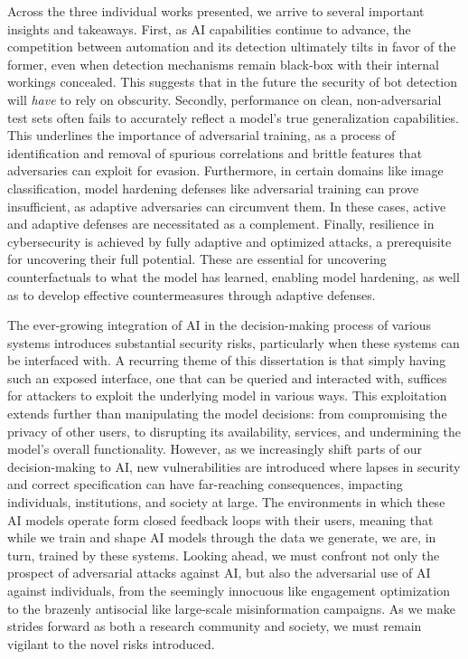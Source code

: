 Across the three individual works presented, we arrive to several important insights and takeaways.
First, as \gls{AI} capabilities continue to advance, the competition between automation and its detection ultimately tilts in favor of the former, even when detection mechanisms remain black-box with their internal workings concealed.
This suggests that in the future the security of bot detection will \textit{have} to rely on obscurity.
Secondly, performance on clean, non-adversarial test sets often fails to accurately reflect a model's true generalization capabilities.
This underlines the importance of adversarial training, as a process of identification and removal of spurious correlations and brittle features that adversaries can exploit for evasion.
Furthermore, in certain domains like image classification, model hardening defenses like adversarial training can prove insufficient, as adaptive adversaries can circumvent them.
In these cases, active and adaptive defenses are necessitated as a complement.
Finally, resilience in cybersecurity is achieved by fully adaptive and optimized attacks, a prerequisite for uncovering their full potential.
These are essential for uncovering counterfactuals to what the model has learned, enabling model hardening, as well as to develop effective countermeasures through adaptive defenses.

The ever-growing integration of \gls{AI} in the decision-making process of various systems introduces substantial security risks, particularly when these systems can be interfaced with.
A recurring theme of this dissertation is that simply having such an exposed interface, one that can be queried and interacted with, suffices for attackers to exploit the underlying model in various ways.
This exploitation extends further than manipulating the model decisions: from compromising the privacy of other users, to disrupting its availability, services, and undermining the model's overall functionality.
However, as we increasingly shift parts of our decision-making to AI, new vulnerabilities are introduced where lapses in security and correct specification can have far-reaching consequences, impacting individuals, institutions, and society at large. 
The environments in which these AI models operate form closed feedback loops with their users, meaning that while we train and shape \gls{AI} models through the data we generate, we are, in turn, trained by these systems.
Looking ahead, we must confront not only the prospect of adversarial attacks against \gls{AI}, but also the adversarial use of \gls{AI} against individuals, from the seemingly innocuous like engagement optimization to the brazenly antisocial like large-scale misinformation campaigns.
As we make strides forward as both a research community and society, we must remain vigilant to the novel risks introduced.
